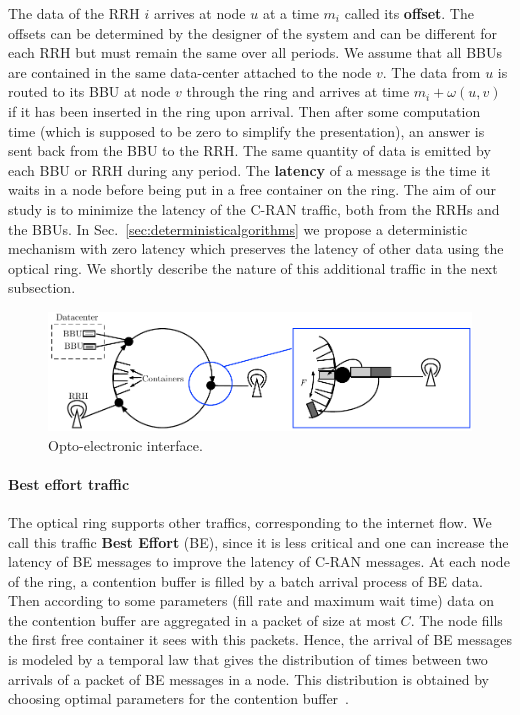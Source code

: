\documentclass[]{algotel}
\begin{document}
   The data of the RRH $i$ arrives at node $u$ at a time $m_i$ called its {\bf offset}. The offsets can be determined 
   by the designer of the system and can be different for each RRH but must remain the same over all periods. We assume that all 
   BBUs are contained in the same data-center attached to the node $v$. The data from $u$ is routed to its BBU at node $v$ through the ring and arrives at time $m_i + \omega(u,v)$ if it has been inserted in the ring upon arrival. Then after some computation time (which is supposed to be zero to simplify the presentation), an answer is sent back from the BBU to the RRH. The same quantity of data is emitted by each BBU or RRH during any period.
   The {\bf latency} of a message is the time it waits in a node before being put in a free container on the ring.
   The aim of our study is to minimize the latency of the C-RAN traffic, both from the RRHs and the BBUs. 
   In Sec.~\ref{sec:deterministicalgorithms} we propose a deterministic mechanism with zero latency which preserves the latency of other data using the optical ring. We shortly describe the nature of this additional traffic in the next subsection.
   
    
\begin{figure}[h!]
\begin{center}   

      \includegraphics[scale=0.8]{interface.pdf}
     \caption{Opto-electronic interface.}\label{fig:interface}
     
\end{center}
  \end{figure}


\paragraph{Best effort traffic}

The optical ring supports other traffics, corresponding to the internet flow. We call this traffic \textbf{Best Effort} (BE), since it is less critical and one can increase the latency of BE messages to improve the latency of C-RAN messages. 
At each node of the ring, a contention buffer is filled by a batch arrival process of BE data. Then according to some parameters (fill rate and maximum wait time) data on the contention buffer are aggregated in a packet of size at most $C$. The node fills the first free container it sees with this packets. Hence, the arrival of BE messages is modeled by a temporal law that gives the distribution of times between two arrivals of a packet of BE messages in a node. This distribution is obtained by choosing optimal parameters for the contention buffer~\cite{youssef2018}.
\end{document}
